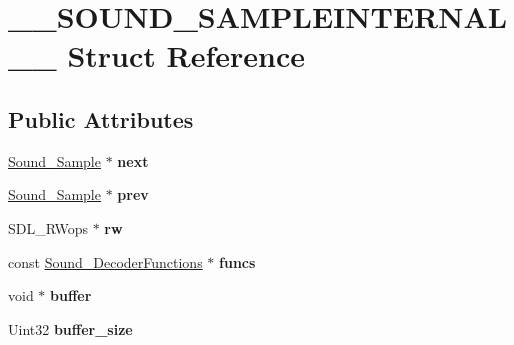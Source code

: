 \hypertarget{struct____SOUND__SAMPLEINTERNAL____}{\section{\-\_\-\-\_\-\-S\-O\-U\-N\-D\-\_\-\-S\-A\-M\-P\-L\-E\-I\-N\-T\-E\-R\-N\-A\-L\-\_\-\-\_\- Struct Reference}
\label{struct____SOUND__SAMPLEINTERNAL____}
}
\subsection*{Public Attributes}
\begin{DoxyCompactItemize}
\item 
\hypertarget{struct____SOUND__SAMPLEINTERNAL_____a8e4b67708fe386edd841d6f52a71ef4e}{\hyperlink{structSound__Sample}{Sound\-\_\-\-Sample} $\ast$ {\bfseries next}}\label{struct____SOUND__SAMPLEINTERNAL_____a8e4b67708fe386edd841d6f52a71ef4e}

\item 
\hypertarget{struct____SOUND__SAMPLEINTERNAL_____a9c095153060ab0c30fdb8d2208954b8c}{\hyperlink{structSound__Sample}{Sound\-\_\-\-Sample} $\ast$ {\bfseries prev}}\label{struct____SOUND__SAMPLEINTERNAL_____a9c095153060ab0c30fdb8d2208954b8c}

\item 
\hypertarget{struct____SOUND__SAMPLEINTERNAL_____aabda850b933dc7b31745e6835315963b}{S\-D\-L\-\_\-\-R\-Wops $\ast$ {\bfseries rw}}\label{struct____SOUND__SAMPLEINTERNAL_____aabda850b933dc7b31745e6835315963b}

\item 
\hypertarget{struct____SOUND__SAMPLEINTERNAL_____ae458ed5196284c3934f94c16521bb844}{const \hyperlink{struct____SOUND__DECODERFUNCTIONS____}{Sound\-\_\-\-Decoder\-Functions} $\ast$ {\bfseries funcs}}\label{struct____SOUND__SAMPLEINTERNAL_____ae458ed5196284c3934f94c16521bb844}

\item 
\hypertarget{struct____SOUND__SAMPLEINTERNAL_____a9fedc50599efb9fb8aed4b0372b8e677}{void $\ast$ {\bfseries buffer}}\label{struct____SOUND__SAMPLEINTERNAL_____a9fedc50599efb9fb8aed4b0372b8e677}

\item 
\hypertarget{struct____SOUND__SAMPLEINTERNAL_____ac0b1328ceed489a7834f95d446902e2a}{Uint32 {\bfseries buffer\-\_\-size}}\label{struct____SOUND__SAMPLEINTERNAL_____ac0b1328ceed489a7834f95d446902e2a}


\end{DoxyCompactItemize}
